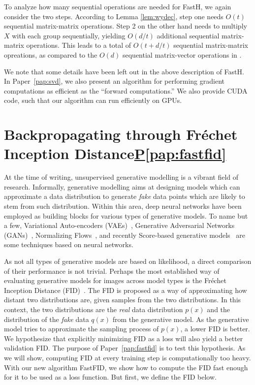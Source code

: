 \documentclass[11pt,a4paper,twoside,openright,final]{memoir}
\newcommand\contribution[1]{\hspace{0.5em}\hyperref[#1]{P\ref{#1}}}
\newcommand*{\paperref}[1]{Paper~\hyperref[#1]{\ref{#1}}}
\begin{document}
To analyze how many sequential operations are needed for FastH, we again consider the two steps.
According to Lemma \ref{lem:wydec}, step one needs $O(t)$ sequential matrix-matrix operations.
Step 2 on the other hand needs to multiply $X$ with each group sequentially, yielding $O(d/t)$ additional sequential matrix-matrix operations.
This leads to a total of $O(t + d/t)$ sequential matrix-matrix opreations, as compared to the $O(d)$ sequential matrix-vector operations in \cite{sequential}. 

We note that some details have been left out in the above description of FastH. 
In \paperref{pap:svd}, we also present an algorithm for performing gradient computations as efficient as the ``forward computations.''
We also provide CUDA code, such that our algorithm can run efficiently on GPUs.

\section{Backpropagating through Fr\'echet Inception Distance\contribution{pap:fastfid}} \label{sec:fid}
At the time of writing, unsupervised generative modelling is a vibrant field of research.
Informally, generative modelling aims at designing models which can approximate a data distribution to generate \emph{fake} data points which are likely to stem from such distribution.
Within this area, deep neural networks have been employed as building blocks for various types of generative models.
To name but a few, Variational Auto-encoders (VAEs)~\cite{vae}, Generative Adversarial Networks (GANs)~\cite{gans}, Normalizing Flows~\cite{nice}, and recently Score-based generative models~\cite{sgm-stochastic-differential-equations} are some techniques based on neural networks.

As not all types of generative models are based on likelihood, a direct comparison of their performance is not trivial.
Perhaps the most established way of evaluating generative models for images across model types is the Fr\'echet Inception Distance (FID)~\cite{fid, fid-comparison}. 
The FID is proposed as a way of approximating how distant two distributions are, given samples from the two distributions. 
In this context, the two distributions are the \emph{real} data distribution $p(x)$ and the distribution of the \emph{fake} data $q(x)$ from the generative model.
As the generative model tries to approximate the sampling process of $p(x)$, a lower FID is better.
We hypothesize that explicitly minimizing FID as a loss will also yield a better validation FID.
The purpose of \paperref{pap:fastfid} is to test this hypothesis.
As we will show, computing FID at every training step is computationally too heavy.
With our new algorithm FastFID, we show how to compute the FID fast enough for it to be used as a loss function. 
But first, we define the FID below.
\end{document}

